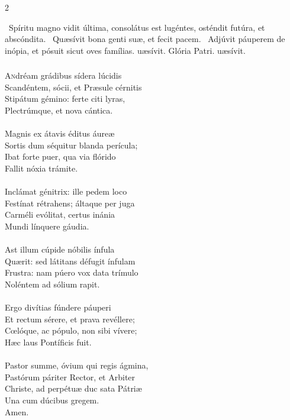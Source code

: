 \documentclass[9pt,twoside]{extarticle}
\begin{document}
\begin{multicols}{2}
\begin{tightlist}{}
\item {}~Spíritu magno vidit última, consolátus est lugéntes, osténdit futúra, et abscóndita. \textred{*}~Quæsívit bona genti suæ, et fecit pacem. ~Adjúvit páuperem de inópia, et pósuit sicut oves famílias. uæsívit. Glória Patri. uæsívit.
\end{tightlist}

\subsubsection*{\center {}}
\lettrine{A}ndréam grádibus sídera lúcidis\\
Scandéntem, sócii, et Præsule cérnitis\\
Stipátum gémino: ferte citi lyras,\\
Plectrúmque, et nova cántica.\\
\\
Magnis ex átavis éditus áureæ\\
Sortis dum séquitur blanda perícula;\\
Ibat forte puer, qua via flórido\\
Fallit nóxia trámite.\\
\\
Inclámat génitrix: ille pedem loco\\
Festínat rétrahens; áltaque per juga\\
Carméli evólitat, certus inánia\\
Mundi línquere gáudia.\\
\\
Ast illum cúpide nóbilis ínfula\\
Quærit: sed látitans défugit ínfulam\\
Frustra: nam púero vox data trímulo\\
Noléntem ad sólium rapit.\\
\\
Ergo divítias fúndere páuperi\\
Et rectum sérere, et prava revéllere;\\
Cœlóque, ac pópulo, non sibi vívere;\\
Hæc laus Pontíficis fuit.\\
\\
Pastor summe, óvium qui regis ágmina,\\
Pastórum páriter Rector, et Arbiter\\
Christe, ad perpétuæ duc sata Pátriæ\\
Una cum dúcibus gregem.\\
Amen.


\end{multicols}
\end{document}
